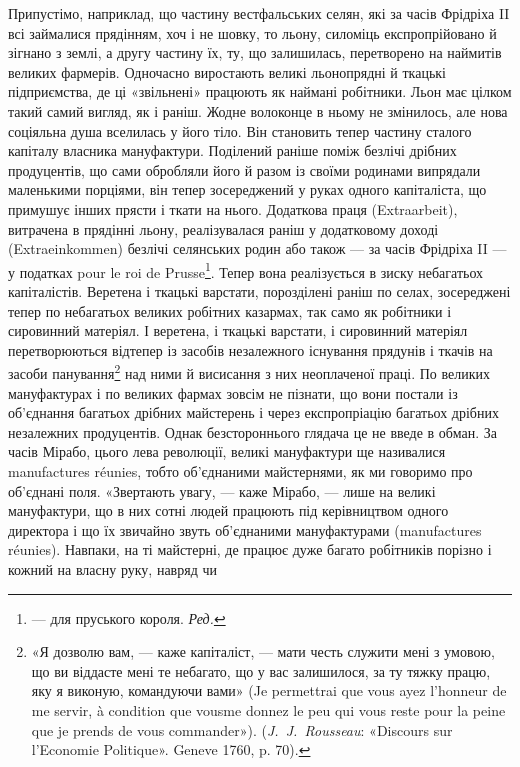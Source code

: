 Припустімо, наприклад, що частину вестфальських селян,
які за часів Фрідріха II всі займалися прядінням, хоч і не шовку,
то льону, силоміць експропрійовано й зігнано з землі, а другу
частину їх, ту, що залишилась, перетворено на наймитів великих
фармерів. Одночасно виростають великі льонопрядні й ткацькі
підприємства, де ці «звільнені» працюють як наймані робітники.
Льон має цілком такий самий вигляд, як і раніш. Жодне волоконце
в ньому не змінилось, але нова соціяльна душа вселилась
у його тіло. Він становить тепер частину сталого капіталу власника
мануфактури. Поділений раніше поміж безлічі дрібних
продуцентів, що сами обробляли його й разом із своїми родинами
випрядали маленькими порціями, він тепер зосереджений у руках
одного капіталіста, що примушує інших прясти і ткати на
нього. Додаткова праця (Extraarbeit), витрачена в прядінні
льону, реалізувалася раніш у додатковому доході (Extraeinkommen)
безлічі селянських родин або також — за часів Фрідріха
II — у податках pour le roi de Prusse\footnote*{
— для пруського короля. \emph{Ред.}
}. Тепер вона реалізується
в зиску небагатьох капіталістів. Веретена і ткацькі варстати,
порозділені раніш по селах, зосереджені тепер по небагатьох
великих робітних казармах, так само як робітники і сировинний
матеріял. І веретена, і ткацькі варстати, і сировинний
матеріял перетворюються відтепер із засобів незалежного існування
прядунів і ткачів на засоби панування\footnote{
«Я дозволю вам, — каже капіталіст, — мати честь служити мені
з умовою, що ви віддасте мені те небагато, що у вас залишилося, за ту
тяжку працю, яку я виконую, командуючи вами» (Je permettrai que
vous ayez l’honneur de me servir, à condition que vousme donnez le peu
qui vous reste pour la peine que je prends de vous commander»). (\emph{J.~J.~Rousseau}:
«Discours sur l’Economie Politique». Geneve 1760, p. 70).
} над ними й висисання
з них неоплаченої праці. По великих мануфактурах і по
великих фармах зовсім не пізнати, що вони постали із об’єднання
багатьох дрібних майстерень і через експропріацію багатьох
дрібних незалежних продуцентів. Однак безстороннього глядача
це не введе в обман. За часів Мірабо, цього лева революції, великі
мануфактури ще називалися manufactures réunies, тобто об’єднаними
майстернями, як ми говоримо про об’єднані поля. «Звертають
увагу, — каже Мірабо, — лише на великі мануфактури,
що в них сотні людей працюють під керівництвом одного директора
і що їх звичайно звуть об’єднаними мануфактурами (manufactures
réunies). Навпаки, на ті майстерні, де працює дуже багато
робітників порізно і кожний на власну руку, навряд чи
